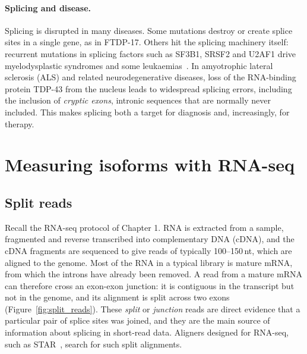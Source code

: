 \paragraph{Splicing and disease.} Splicing is disrupted in many diseases. Some mutations destroy or create splice sites in a single gene, as in FTDP-17. Others hit the splicing machinery itself: recurrent mutations in splicing factors such as SF3B1, SRSF2 and U2AF1 drive myelodysplastic syndromes and some leukaemias~\citep{desterro2020}. In amyotrophic lateral sclerosis (ALS) and related neurodegenerative diseases, loss of the RNA-binding protein TDP-43 from the nucleus leads to widespread splicing errors, including the inclusion of \emph{cryptic exons}, intronic sequences that are normally never included. This makes splicing both a target for diagnosis and, increasingly, for therapy.

\section{Measuring isoforms with RNA-seq}
\label{sec:rnaseq_isoforms}

\subsection{Split reads}

Recall the RNA-seq protocol of Chapter 1. RNA is extracted from a sample, fragmented and reverse transcribed into complementary DNA (cDNA), and the cDNA fragments are sequenced to give reads of typically 100--150\,nt, which are aligned to the genome. Most of the RNA in a typical library is mature mRNA, from which the introns have already been removed. A read from a mature mRNA can therefore cross an exon-exon junction: it is contiguous in the transcript but not in the genome, and its alignment is split across two exons (Figure~\ref{fig:split_reads}). These \emph{split} or \emph{junction} reads are direct evidence that a particular pair of splice sites was joined, and they are the main source of information about splicing in short-read data. Aligners designed for RNA-seq, such as STAR~\citep{dobin2013}, search for such split alignments.

